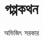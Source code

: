 \documentclass[a4paper,10pt,xelatex]{article}
\begin{document}
\begin{titlepage}
\title{গপ্পকথন}
\author{অভিজিৎ সরকার}
\maketitle
\vspace{-2em}
‌‌
\end{titlepage}




\end{document}
